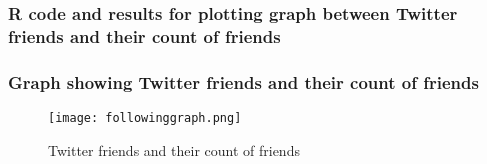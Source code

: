 \subsubsection{R code and results for plotting graph between Twitter friends and their count of friends}

\newpage
\subsubsection{Graph showing Twitter friends and their count of friends}
\begin{figure}[ht]    
    \begin{center}
        \texttt{[image: followinggraph.png]}
        \caption{Twitter friends and their count of friends}
        \label{graph3}
    \end{center}
\end{figure}
\newpage

